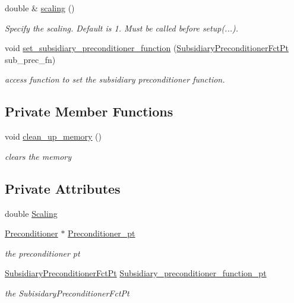 \begin{DoxyCompactItemize}
double \& \hyperlink{classoomph_1_1PseudoElasticPreconditionerSubsidiaryPreconditionerOld_a38a9cf93e354ea1fbb76f8d8fa1df0ab}{scaling} ()
\begin{DoxyCompactList}\small\item\em Specify the scaling. Default is 1. Must be called before setup(...). \end{DoxyCompactList}\item 
void \hyperlink{classoomph_1_1PseudoElasticPreconditionerSubsidiaryPreconditionerOld_a6fd50251d78370846929956b3eabf310}{set\+\_\+subsidiary\+\_\+preconditioner\+\_\+function} (\hyperlink{classoomph_1_1PseudoElasticPreconditionerSubsidiaryPreconditionerOld_a2ee5b7ddad26a4eb6662e2b701ab0a52}{Subsidiary\+Preconditioner\+Fct\+Pt} sub\+\_\+prec\+\_\+fn)
\begin{DoxyCompactList}\small\item\em access function to set the subsidiary preconditioner function. \end{DoxyCompactList}\end{DoxyCompactItemize}
\subsection*{Private Member Functions}
\begin{DoxyCompactItemize}
\item 
void \hyperlink{classoomph_1_1PseudoElasticPreconditionerSubsidiaryPreconditionerOld_a45086bd75b2d82f65deae8cac23c4c47}{clean\+\_\+up\+\_\+memory} ()
\begin{DoxyCompactList}\small\item\em clears the memory \end{DoxyCompactList}\end{DoxyCompactItemize}
\subsection*{Private Attributes}
\begin{DoxyCompactItemize}
\item 
double \hyperlink{classoomph_1_1PseudoElasticPreconditionerSubsidiaryPreconditionerOld_a9815c3c63cc82fcfb7bcd914459e5445}{Scaling}
\item 
\hyperlink{classoomph_1_1Preconditioner}{Preconditioner} $\ast$ \hyperlink{classoomph_1_1PseudoElasticPreconditionerSubsidiaryPreconditionerOld_a48413dd5490629563b76bb34b1e2e256}{Preconditioner\+\_\+pt}
\begin{DoxyCompactList}\small\item\em the preconditioner pt \end{DoxyCompactList}\item 
\hyperlink{classoomph_1_1PseudoElasticPreconditionerSubsidiaryPreconditionerOld_a2ee5b7ddad26a4eb6662e2b701ab0a52}{Subsidiary\+Preconditioner\+Fct\+Pt} \hyperlink{classoomph_1_1PseudoElasticPreconditionerSubsidiaryPreconditionerOld_a15876ef914c08070cc025f3b6696e4e1}{Subsidiary\+\_\+preconditioner\+\_\+function\+\_\+pt}
\begin{DoxyCompactList}\small\item\em the Subisidary\+Preconditioner\+Fct\+Pt \end{DoxyCompactList}\end{DoxyCompactItemize}
